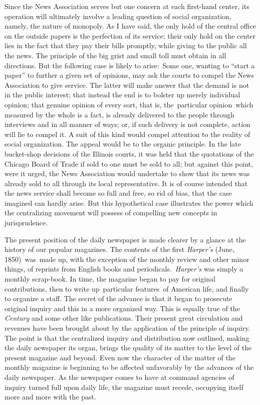 \documentclass[twoside,symmetric,nobib,justified]{tufte-book}
\begin{document}
Since the News Association serves but one concern at each first-hand
center, its operation will ultimately involve a leading question of
social organization, namely, the nature of monopoly. As I have said, the
only hold of the central office on the outside papers is the perfection
of its service; their only hold on the center lies in the fact that they
pay their bills promptly, while giving to the public all the news. The
principle of the big grist and small toll must obtain in all directions.
But the following case is likely to arise:~Some one, wanting to ``start
a paper'' to further a given set of opinions, may ask the courts to
compel the News Association to give service. The latter will make answer
that the demand is not in the public interest; that instead the end is
to bolster up merely individual opinion; that genuine opinion of every
sort, that is, the~particular opinion~which measured by the whole is a
fact, is already delivered to the people through interviews and in all
manner of ways; or, if such delivery is not complete, action will lie to
compel it. A suit of this kind would compel attention to the reality of
social organization. The appeal would be to the organic principle. In
the late bucket-shop decisions of the Illinois courts, it was held that
the quotations of the Chicago Board of Trade if sold to one must be sold
to all; but against this point, were it urged, the News Association
would undertake to show that its news was already sold to all through
its local representative. It is of course intended that the news service
shall become so full and free, so rid of bias, that the case imagined
can hardly arise. But this hypothetical case illustrates the power which
the centralizing movement will possess of compelling new concepts in
jurisprudence.~

The present position of the daily newspaper is made clearer by a glance
at the history of our popular magazines. The contents of the first
\emph{Harper's} (June, 1850)~was~made up, with the exception of the
monthly review and other minor things, of reprints from English books
and periodicals.~\emph{Harper's} was simply a monthly scrap-book. In
time, the magazine began to pay for original contributions, then to
write up~particular features~of American life, and finally to organize a
staff. The secret of the advance is that it began to prosecute original
inquiry and this in a more organized way. This is equally true of the
\emph{Century} and some other like publications. Their present great
circulation and revenues have been brought about by the application of
the principle of inquiry. The point is that the centralized inquiry and
distribution now outlined, making the daily newspaper its organ, brings
the quality of its matter to the level of the present magazine and
beyond. Even now the character of the matter of the monthly magazine is
beginning to be affected unfavorably by the advances of the daily
newspaper. As the newspaper comes to have at command agencies of inquiry
turned full upon daily life, the magazine must recede, occupying itself
more and more with the past.~
\end{document}
